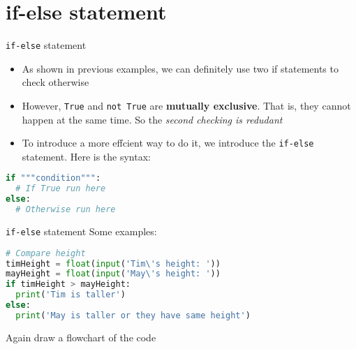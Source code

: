 \documentclass[10pt,xcolor={table,dvipsnames},t]{beamer}
\begin{document}
\section{if-else statement}
\begin{frame}[fragile]{\texttt{if-else} statement}
  \begin{itemize}
    \item As shown in previous examples, we can definitely use two if statements to check otherwise
    \item However, \texttt{True} and \texttt{not True} are \textbf{mutually exclusive}. That is, they cannot happen at the same time. So the \textit{second checking is redudant}
    \item To introduce a more effcient way to do it, we introduce the \texttt{if-else} statement. Here is the syntax:
  \end{itemize}
\begin{lstlisting}[language=python]
if """condition""":
  # If True run here
else:
  # Otherwise run here
\end{lstlisting}
\end{frame}
\begin{frame}[fragile]{\texttt{if-else} statement}
Some examples:
\begin{lstlisting}[language=python]
# Compare height
timHeight = float(input('Tim\'s height: '))
mayHeight = float(input('May\'s height: '))
if timHeight > mayHeight:
  print('Tim is taller')
else:
  print('May is taller or they have same height')
\end{lstlisting}
Again draw a flowchart of the code
\end{frame}


\end{document}
